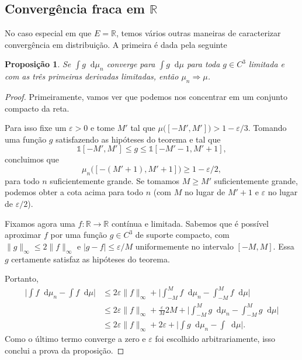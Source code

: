 \documentclass[reqno, draft]{book}
\newcommand*\1{\mathds{1}}
\newtheorem{proposition}[theorem]{Proposição}
\renewcommand*\d{\mathop{}\!\mathrm{d}}
\begin{document}
\subsection{Convergência fraca em \texorpdfstring{$\mathbb{R}$}{R}}

No caso especial em que $E = \mathbb{R}$, temos vários outras maneiras de caracterizar convergência em distribuição.
A primeira é dada pela seguinte

\begin{proposition}
  \label{p:conv_distr_suave}
  Se $\int g \d \mu_n$ converge para $\int g \d \mu$ para toda $g \in C^3$ limitada e com as três primeiras derivadas limitadas, então $\mu_n \Rightarrow \mu$.
\end{proposition}

\begin{proof}
  Primeiramente, vamos ver que podemos nos concentrar em um conjunto compacto da reta.

  Para isso fixe um $\varepsilon > 0$ e tome $M'$ tal que $\mu\big( [-M', M'] \big) > 1 - \varepsilon / 3$.
  Tomando uma função $g$ satisfazendo as hipóteses do teorema e tal que
  \begin{equation}
    \1{[-M',M']} \leq g \leq \1{[-M'-1,M'+1]},
  \end{equation}
  concluimos que
  \begin{equation}
    \mu_n \big( [-(M'+1), M'+1] \big) \geq 1 - \varepsilon/2,
  \end{equation}
  para todo $n$ suficientemente grande.
  Se tomamos $M \geq M'$ suficientemente grande, podemos obter a cota acima para todo $n$ (com $M$ no lugar de $M'+1$ e $\varepsilon$ no lugar de $\varepsilon/2$).

  Fixamos agora uma $f: \mathbb{R} \to \mathbb{R}$ contínua e limitada.
  Sabemos que é possível aproximar $f$ por uma função $g \in C^3$ de suporte compacto, com $\lVert g \rVert_\infty \leq 2 \lVert f \rVert_\infty$ e $|g - f| \leq \varepsilon/M$ uniformemente no intervalo $[-M,M]$.
  Essa $g$ certamente satisfaz as hipóteses do teorema.

  Portanto,
  \begin{equation*}
    \begin{split}
      \Big| \int f \d \mu_n - \int f \d \mu\Big| & \leq 2 \varepsilon \lVert f \rVert_\infty + \Big| \int_{-M}^M f \d \mu_n - \int_{-M}^M f \d \mu\Big|\\
      & \leq 2 \varepsilon \lVert f \rVert_\infty + \frac \varepsilon{M} 2 M + \Big| \int_{-M}^M g \d \mu_n - \int_{-M}^M g \d \mu\Big|\\
      & \leq 2 \varepsilon \lVert f \rVert_\infty + 2 \varepsilon + \Big| \int g \d \mu_n - \int \d \mu\Big|.
    \end{split}
  \end{equation*}
  Como o último termo converge a zero e $\varepsilon$ foi escolhido arbitrariamente, isso conclui a prova da proposição.
\end{proof}
\end{document}
